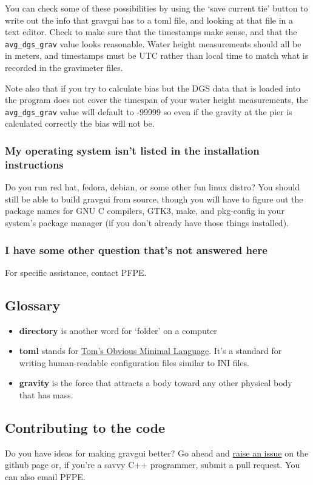 \documentclass{pfpe-manual}
\begin{document}
You can check some of these possibilities by using the `save current tie' button to write out the info that gravgui has to a toml file, and looking at that file in a text editor. Check to make sure that the timestamps make sense, and that the \texttt{avg\_dgs\_grav} value looks reasonable. Water height measurements should all be in meters, and timestamps must be UTC rather than local time to match what is recorded in the gravimeter files.

Note also that if you try to calculate bias but the DGS data that is loaded into the program does not cover the timespan of your water height measurements, the \texttt{avg\_dgs\_grav} value will default to -99999 so even if the gravity at the pier is calculated correctly the bias will not be.

\subsubsection{My operating system isn't listed in the installation instructions}
Do you run red hat, fedora, debian, or some other fun linux distro? You should still be able to build gravgui from source, though you will have to figure out the package names for GNU C compilers, GTK3, make, and pkg-config in your system's package manager (if you don't already have those things installed).

\subsubsection{I have some other question that's not answered here}
For specific assistance, contact PFPE.

\subsection{Glossary}
\begin{itemize}
\item \textbf{directory} is another word for `folder' on a computer
\item \textbf{toml} stands for \href{https://toml.io/}{Tom's Obvious Minimal Language}. It's a standard for writing human-readable configuration files similar to INI files.
\item \textbf{gravity} is the force that attracts a body toward any other physical body that has mass.
\end{itemize}

\subsection{Contributing to the code}
Do you have ideas for making gravgui better? Go ahead and \href{https://github.com/hfmark/gravgui/issues}{raise an issue} on the github page or, if you're a savvy C++ programmer, submit a pull request. You can also email PFPE.
\end{document}
